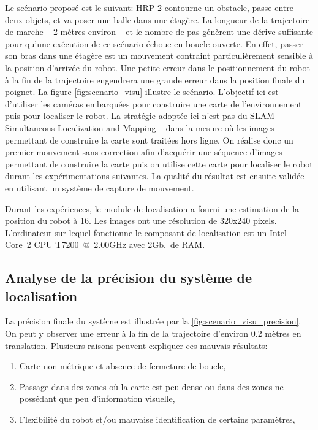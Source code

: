 Le scénario proposé est le suivant: HRP-2 contourne un
obstacle, passe entre deux objets, et va poser une balle dans une
étagère. La longueur de la trajectoire de marche -- 2 mètres environ
-- et le nombre de pas génèrent une dérive suffisante pour qu'une
exécution de ce scénario échoue en boucle ouverte. En effet, passer
son bras dans une étagère est un mouvement contraint particulièrement
sensible à la position d'arrivée du robot. Une petite erreur dans le
positionnement du robot à la fin de la trajectoire engendrera une
grande erreur dans la position finale du poignet. La figure
\autoref{fig:scenario_visu} illustre le scénario.  L'objectif ici est
d'utiliser les caméras embarquées pour construire une carte de
l'environnement puis pour localiser le robot. La stratégie adoptée ici
n'est pas du SLAM -- Simultaneous Localization and Mapping
-- dans la mesure
où les images permettant de construire la carte sont traitées hors
ligne. On réalise donc un premier mouvement sans correction afin
d'acquérir une séquence d'images permettant de construire la carte
puis on utilise cette carte pour localiser le robot durant les
expérimentations suivantes. La qualité du résultat est ensuite validée
en utilisant un système de capture de mouvement.


Durant les expériences, le module de localisation a fourni une
estimation de la position du robot à 16\hertz. Les images ont une
résolution de 320x240 pixels. L'ordinateur sur lequel fonctionne le
composant de localisation est un Intel\textregistered
Core\texttrademark\ 2 CPU T7200 @ 2.00GHz avec 2Gb.\ de RAM.


\subsection{Analyse de la précision du système de localisation}

La précision finale du système est illustrée par la
\autoref{fig:scenario_visu_precision}. On peut y observer une erreur à
la fin de la trajectoire d'environ 0.2 mètres en
translation. Plusieurs raisons peuvent expliquer ces mauvais
résultats:
\begin{enumerate}
\item Carte non métrique et absence de fermeture de boucle,
\item Passage dans des zones où la carte est peu dense ou dans des
  zones ne possédant que peu d'information visuelle,
\item Flexibilité du robot et/ou mauvaise identification de certains paramètres,
\end{enumerate}


